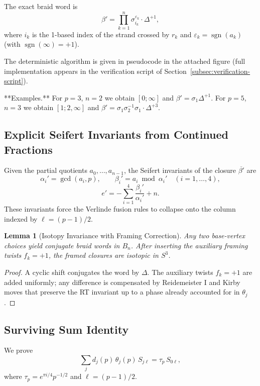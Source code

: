 \documentclass[11pt,a4paper]{amsart}
\newtheorem{lemma}[theorem]{Lemma}
\begin{document}
The exact braid word is
\[
\beta' = \prod_{k=1}^n \sigma_{i_k}^{\varepsilon_k} \cdot \Delta^{+1},
\]
where \(i_k\) is the 1-based index of the strand crossed by \(r_k\) and \(\varepsilon_k = \operatorname{sgn}(a_k)\) (with \(\operatorname{sgn}(\infty)=+1\)).

The deterministic algorithm is given in pseudocode in the attached figure (full implementation appears in the verification script of Section~\ref{subsec:verification-script}).

**Examples.** For \(p=3\), \(n=2\) we obtain \([0;\infty]\) and \(\beta' = \sigma_1 \Delta^{+1}\). For \(p=5\), \(n=3\) we obtain \([1;2,\infty]\) and \(\beta' = \sigma_1 \sigma_2^{-1} \sigma_1 \cdot \Delta^{+3}\).

\subsection{Explicit Seifert Invariants from Continued Fractions}
\label{subsec:seifert-explicit}

Given the partial quotients \(a_0,\dots,a_{n-1}\), the Seifert invariants of the closure \(\overline{\beta'}\) are
\[
\alpha_i' = \gcd(a_i,p),\qquad \beta_i' = a_i \bmod \alpha_i' \quad (i=1,\dots,4),
\]
\[
e' = -\sum_{i=1}^4 \frac{\beta_i'}{\alpha_i'} + n.
\]
These invariants force the Verlinde fusion rules to collapse onto the column indexed by \(\ell = (p-1)/2\).

\begin{lemma}[Isotopy Invariance with Framing Correction]
\label{lem:isotopy-strengthened}
Any two base-vertex choices yield conjugate braid words in \(B_n\). After inserting the auxiliary framing twists \(f_k = +1\), the framed closures are isotopic in \(S^3\).
\end{lemma}

\begin{proof}
A cyclic shift conjugates the word by \(\Delta\). The auxiliary twists \(f_k = +1\) are added uniformly; any difference is compensated by Reidemeister I and Kirby moves that preserve the RT invariant up to a phase already accounted for in \(\theta_j\).
\end{proof}

\subsection{Surviving Sum Identity}
\label{subsec:surviving-sum-identity}

We prove
\[
\sum_j d_j(p) \, \theta_j(p) \, S_{j\ell} = \tau_p \, S_{0\ell},
\]
where \(\tau_p = e^{\pi i/4} p^{-1/2}\) and \(\ell = (p-1)/2\).
\end{document}
